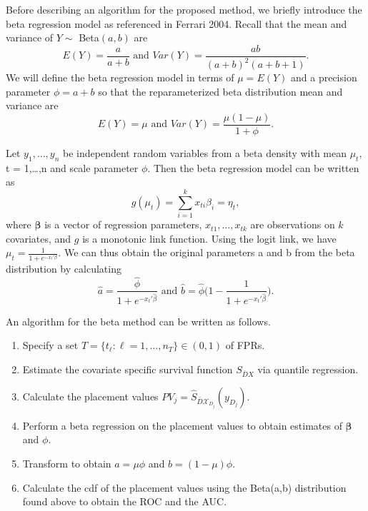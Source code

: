 \documentclass{interact}
\theoremstyle{definition}
\begin{document}
   

Before describing an algorithm for the proposed method, we briefly introduce the beta regression model as referenced in Ferrari 2004.  Recall that the mean and variance of $Y \sim$ Beta$(a, b)$ are
$$E(Y) = \frac{a}{a + b} \text{ and } Var(Y) = \frac{a b}{(a + b)^2(a+b +1)}.$$
We will define the beta regression model in terms of $\mu = E(Y)$ and a precision parameter $\phi = a + b$ so that the reparameterized beta distribution mean and variance are
$$E(Y) = \mu \text{ and } Var(Y) = \frac{\mu(1 - \mu)}{1 + \phi}.$$ 


\noindent Let $y_1,\ldots, y_n$ be independent random variables from a beta density with mean $\mu_t,$ t = 1,\ldots,n and scale parameter $\phi.$ 
 Then the beta regression model can be written as
$$ g(\mu_t) = \sum_{i = 1}^k x_{ti} \beta_i = \eta_t,$$
where  $\boldsymbol{\beta}$ is a vector of regression parameters, $x_{t1},\ldots, x_{tk}$ are observations on $k$ covariates, and $g$ is a monotonic link function.
 Using the logit link, we have 
$\mu_t = \frac{1}{1 + e^{-x_t'\beta}}.$
We can thus obtain the original parameters a and b from the beta distribution by calculating
$$ \hat{a} = \frac{\hat{\phi}}{1 + e^{-x_t'\hat{\beta}}} \text{ and }  \hat{b} = \hat{\phi} \bigg( 1 - \frac{1}{1 + e^{-x_t'\hat{\beta}}}\bigg). $$

\noindent An algorithm for the beta method can be written as follows.


	\begin{enumerate}
	\item Specify a set $T = \{t_{\ell}: \ell = 1, \ldots, n_T\} \in (0,1)$ of FPRs.

		\item Estimate the covariate specific survival function $S_{\bar{D}{X}}$ via quantile regression.
		
	\item Calculate the placement values $PV_j = \hat{S}_{\bar{D} \mathcal{X}_{D_j}} (y_{D_j}).$ 
	
	\item Perform a beta regression on the placement values to obtain estimates of $\boldsymbol{\beta}$ and $\phi$.
	\item Transform to obtain $a = \mu \phi$ and $b = ( 1 - \mu)\phi$.
	\item Calculate the cdf of the placement values using the Beta(a,b) distribution found above to obtain the ROC and the AUC.
	
	\end{enumerate}
\end{document}
